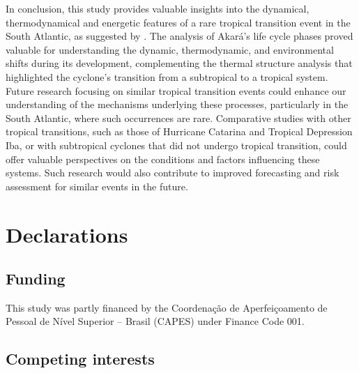 \documentclass[pdflatex,sn-chicago]{sn-jnl}%
\theoremstyle{plain}
\theoremstyle{definition}
\theoremstyle{remark}
\theoremstyle{definition}
\begin{document}
In conclusion, this study provides valuable insights into the dynamical, thermodynamical and energetic features of a rare tropical transition event in the South Atlantic, as suggested by \citet{reboita2024assessment}. The analysis of Akará's life cycle phases proved valuable for understanding the dynamic, thermodynamic, and environmental shifts during its development, complementing the thermal structure analysis that highlighted the cyclone's transition from a subtropical to a tropical system. Future research focusing on similar tropical transition events could enhance our understanding of the mechanisms underlying these processes, particularly in the South Atlantic, where such occurrences are rare. Comparative studies with other tropical transitions, such as those of Hurricane Catarina and Tropical Depression Iba, or with subtropical cyclones that did not undergo tropical transition, could offer valuable perspectives on the conditions and factors influencing these systems. Such research would also contribute to improved forecasting and risk assessment for similar events in the future.


\backmatter





\section*{Declarations}

\subsection*{Funding}

This study was partly financed by the Coordenação de Aperfeiçoamento de Pessoal de Nível Superior – Brasil (CAPES) under Finance Code 001.

\subsection*{Competing interests}
\end{document}

